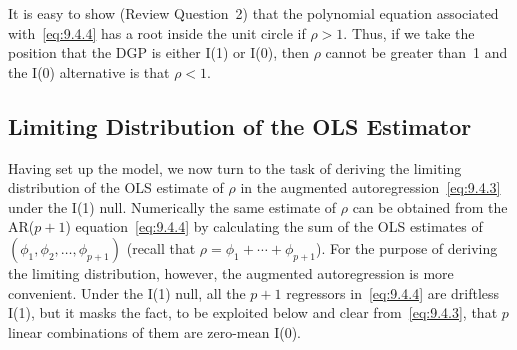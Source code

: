 It is easy to show (Review Question~2) that the polynomial equation associated
with~\eqref{eq:9.4.4} has a root inside the unit circle if $\rho > 1$. Thus, if we take the position
that the DGP is either I(1) or I(0), then $\rho$ cannot be greater than~1 and the I(0)
alternative is that $\rho < 1$.

\subsection*{Limiting Distribution of the OLS Estimator}

Having set up the model, we now turn to the task of deriving the limiting distribution of the OLS estimate of $\rho$ in the augmented autoregression~\eqref{eq:9.4.3} under the
I(1) null. Numerically the same estimate of $\rho$ can be obtained from the AR($p+1$)
equation~\eqref{eq:9.4.4} by calculating the sum of the OLS estimates of $(\phi_1, \phi_2, \ldots, \phi_{p+1})$
(recall that $\rho = \phi_1 + \cdots + \phi_{p+1}$). For the purpose of deriving the limiting distribution, however, the augmented autoregression is more convenient. Under the I(1)
null, all the $p+1$ regressors in~\eqref{eq:9.4.4} are driftless I(1), but it masks the fact, to
be exploited below and clear from~\eqref{eq:9.4.3}, that $p$ linear combinations of them are
zero-mean I(0).

